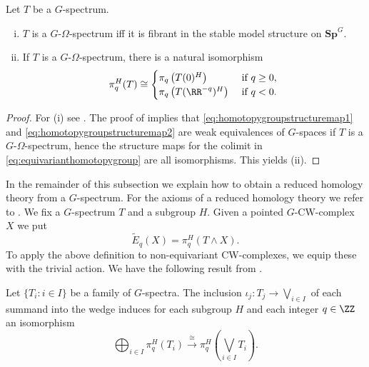 \begin{lem}
Let $T$ be a $G$-spectrum.
\begin{enumerate}[(i)]
\item $T$ is a $G$-$\Omega$-spectrum iff it is fibrant
in the stable model structure on $\mathbf{Sp}^G$.
\item If $T$ is a $G$-$\Omega$-spectrum, there is a natural isomorphism
\begin{equation}\label{eq:homotopygroupomegaspectrum}
\pi_q^H(T)\cong
\begin{cases}
\pi_q\left(T(0)^H\right) &\text{ if } q\ge 0,\\
\pi_q\left(T(\RR^{-q})^H\right) &\text{ if } q<0.
\end{cases}
\end{equation}
\end{enumerate}
\end{lem}
\begin{proof}
For (i) see \cite[Proposition~III.4.12, \pno~50]{mandellmay}.
The proof of \cite[Lemma~III.3.3, \pno~45]{mandellmay} implies that
\eqref{eq:homotopygroupstructuremap1} and \eqref{eq:homotopygroupstructuremap2}
are weak equivalences of $G$-spaces if $T$ is a $G$-$\Omega$-spectrum,
hence the structure maps for the colimit in \eqref{eq:equivarianthomotopygroup}
are all isomorphisms. This yields (ii).
\end{proof}
In the remainder of this subsection we explain how to obtain a reduced homology
theory from a $G$-spectrum. For the axioms of a reduced homology
theory we refer to \cite[\pno~110]{mayconcise}. We fix a $G$-spectrum $T$
and a subgroup $H$. Given a pointed $G$-CW-complex $X$
we put
\begin{equation}\label{eq:spectrumhomology}
\tilde E_q(X) = \pi_q^H(T\wedge X).
\end{equation}
To apply the above definition to non-equivariant CW-complexes, we equip
these with the trivial action.
We have the following result from \cite[Theorem~III.3.5]{mandellmay}.
\begin{lem}\label{lem:spectrumwedge}
Let $\{T_i:i\in I\}$ be a family of $G$-spectra. The inclusion
$\iota_j:T_j\to \bigvee_{i\in I}$ of each summand into the wedge
induces for each subgroup $H$ and each integer $q\in \ZZ$ an isomorphism 
\begin{equation}
\bigoplus_{i\in I} \pi_q^H(T_i)\xrightarrow{\cong} \pi_q^H\left(\bigvee_{i\in I} T_i\right).
\end{equation}
\end{lem}

